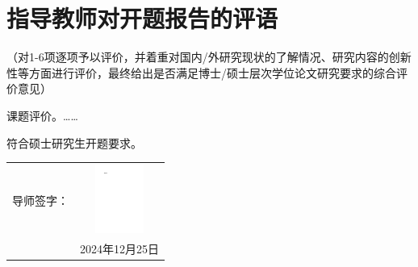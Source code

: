 \section{指导教师对开题报告的评语}\label{sec:advisorComments}
（对1-6项逐项予以评价，并着重对国内/外研究现状的了解情况、研究内容的创新性等方面进行评价，最终给出是否满足博士/硕士层次学位论文研究要求的综合评价意见）

课题评价。……

符合硕士研究生开题要求。
\vfill{}\,
\begin{flushright}
    \begin{tabular}{rr}
       导师签字： & \multicolumn{1}{c}{\includegraphics[width = 1.6cm]{image/teacher-name.pdf}} \\[10 mm]
            & 2024年12月25日 \\[30 mm]
    \end{tabular}%
\end{flushright}